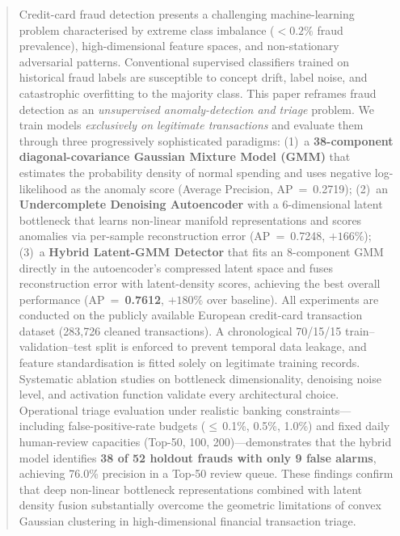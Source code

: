 \documentclass[conference,10pt]{IEEEtran}
\begin{document}
\begin{abstract}
Credit-card fraud detection presents a challenging machine-learning problem
characterised by extreme class imbalance ($<\!0.2\%$ fraud prevalence),
high-dimensional feature spaces, and non-stationary adversarial patterns.
Conventional supervised classifiers trained on historical fraud labels are
susceptible to concept drift, label noise, and catastrophic overfitting to the
majority class.  This paper reframes fraud detection as an \emph{unsupervised
anomaly-detection and triage} problem.  We train models \emph{exclusively on
legitimate transactions} and evaluate them through three progressively
sophisticated paradigms:
%
(1)~a \textbf{38-component diagonal-covariance Gaussian Mixture Model (GMM)}
that estimates the probability density of normal spending and uses negative
log-likelihood as the anomaly score (Average Precision, AP~=~0.2719);
%
(2)~an \textbf{Undercomplete Denoising Autoencoder} with a 6-dimensional
latent bottleneck that learns non-linear manifold representations and scores
anomalies via per-sample reconstruction error (AP~=~0.7248, $+166\%$);
%
(3)~a \textbf{Hybrid Latent-GMM Detector} that fits an 8-component GMM
directly in the autoencoder's compressed latent space and fuses reconstruction
error with latent-density scores, achieving the best overall performance
(AP~=~\textbf{0.7612}, $+180\%$ over baseline).
%
All experiments are conducted on the publicly available European credit-card
transaction dataset (283,726 cleaned transactions).  A chronological
70/15/15 train--validation--test split is enforced to prevent temporal data
leakage, and feature standardisation is fitted solely on legitimate training
records.  Systematic ablation studies on bottleneck dimensionality, denoising
noise level, and activation function validate every architectural choice.
Operational triage evaluation under realistic banking constraints---including
false-positive-rate budgets ($\le$\,0.1\%, 0.5\%, 1.0\%) and fixed daily
human-review capacities (Top-50, 100, 200)---demonstrates that the hybrid
model identifies \textbf{38 of 52 holdout frauds with only 9 false alarms},
achieving 76.0\% precision in a Top-50 review queue.  These findings confirm
that deep non-linear bottleneck representations combined with latent density
fusion substantially overcome the geometric limitations of convex Gaussian
clustering in high-dimensional financial transaction triage.
\end{abstract}
\end{document}
